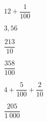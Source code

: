 
\medskip

\begin{multicols}{2}
\begin{spacing}{3}

$12+\dfrac{1}{100}$

$3,56$

$\dfrac{213}{10}$

$\dfrac{358}{100}$

$4+\dfrac{5}{100}+\dfrac{2}{10}$

$\dfrac{205}{1~000}$

\end{spacing}	
\end{multicols}